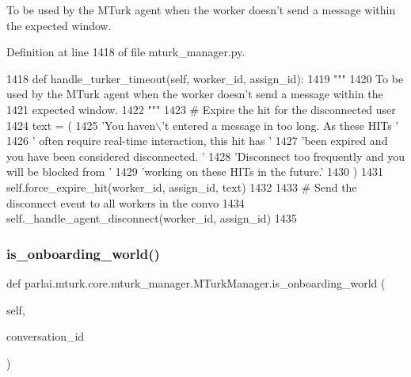 \begin{DoxyVerb}To be used by the MTurk agent when the worker doesn't send a message within the
expected window.
\end{DoxyVerb}
 

Definition at line 1418 of file mturk\+\_\+manager.\+py.


\begin{DoxyCode}
1418     \textcolor{keyword}{def }handle\_turker\_timeout(self, worker\_id, assign\_id):
1419         \textcolor{stringliteral}{"""}
1420 \textcolor{stringliteral}{        To be used by the MTurk agent when the worker doesn't send a message within the}
1421 \textcolor{stringliteral}{        expected window.}
1422 \textcolor{stringliteral}{        """}
1423         \textcolor{comment}{# Expire the hit for the disconnected user}
1424         text = (
1425             \textcolor{stringliteral}{'You haven\(\backslash\)'t entered a message in too long. As these HITs '}
1426             \textcolor{stringliteral}{' often require real-time interaction, this hit has '}
1427             \textcolor{stringliteral}{'been expired and you have been considered disconnected. '}
1428             \textcolor{stringliteral}{'Disconnect too frequently and you will be blocked from '}
1429             \textcolor{stringliteral}{'working on these HITs in the future.'}
1430         )
1431         self.force\_expire\_hit(worker\_id, assign\_id, text)
1432 
1433         \textcolor{comment}{# Send the disconnect event to all workers in the convo}
1434         self.\_handle\_agent\_disconnect(worker\_id, assign\_id)
1435 
\end{DoxyCode}
\mbox{\label{classparlai_1_1mturk_1_1core_1_1mturk__manager_1_1MTurkManager_a9368a0f0fa8eb1791e4a4206ce291e25}} 
\subsubsection{\texorpdfstring{is\+\_\+onboarding\+\_\+world()}{is\_onboarding\_world()}}
{\footnotesize\ttfamily def parlai.\+mturk.\+core.\+mturk\+\_\+manager.\+M\+Turk\+Manager.\+is\+\_\+onboarding\+\_\+world (\begin{DoxyParamCaption}\item[{}]{self,  }\item[{}]{conversation\+\_\+id }\end{DoxyParamCaption})}



